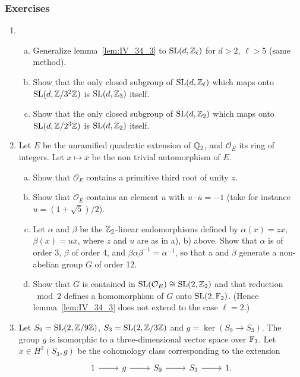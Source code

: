 \subsubsection*{Exercises}
\begin{enumerate}
\item
	\begin{enumerate}[a)]
		\item Generalize lemma~\ref{lem:IV_34_3} to $\operatorname{SL}(d, \mathbb{Z}_\ell)$
			for $d > 2$, $\ell > 5$ (same method).
		\item Show that the only closed subgroup of $\operatorname{SL}(d, \mathbb{Z}_\ell)$
			which maps onto $\operatorname{SL}(d, \mathbb{Z}/3^2\mathbb{Z})$ is $\operatorname{SL}(d, \mathbb{Z}_3)$
			itself.
		\item Show that the only closed subgroup of $\operatorname{SL}(d, \mathbb{Z}_2)$
			which maps onto $\operatorname{SL}(d, \mathbb{Z}/2^3\mathbb{Z})$ is $\operatorname{SL}(d, \mathbb{Z}_2)$
			itself.
	\end{enumerate}
\item Let $E$ be the unramified quadratic extension of $\mathbb{Q}_2$, and
	\dpage
	$\mathcal{O}_E$ its ring of integers. Let $x \mapsto \overline{x}$ be
	the non trivial automorphism of $E$.
\begin{enumerate}[a)]
	\item Show that $\mathcal{O}_E$ contains a primitive third root of
		unity $z$.
	\item Show that $\mathcal{O}_E$ contains an element $u$ with $u \cdot
		\overline{u} = -1$ (take for instance $u = (1 + \sqrt{5})/2$).
	\item Let $\alpha$ and $\beta$ be the $\mathbb{Z}_2$-linear endomorphisms
		defined by $\alpha(x) = zx$, $\beta(x) = u\overline{x}$, where
		$z$ and $u$ are as in a), b) above. Show that $\alpha$ is of
		order 3, $\beta$ of order 4, and $\beta \alpha \beta^{-1} =
		\alpha^{-1}$, so that a and $\beta$ generate a non-abelian
		group $G$ of order 12.
	\item Show that $G$ is contained in $\operatorname{SL}(\mathcal{O}_E) \cong \operatorname{SL}(2,
		\mathbb{Z}_2)$ and that reduction $\bmod 2$ defines a homomorphism of
		$G$ onto $\operatorname{SL}(2, \mathbb{F}_2)$.  (Hence lemma~\ref{lem:IV_34_3} does
		not extend to the case $\ell = 2$.)
\end{enumerate}
\item Let $S_9 = \operatorname{SL}(2, \mathbb{Z}/9\mathbb{Z})$, $S_3 = \operatorname{SL}(2, \mathbb{Z}/3\mathbb{Z})$ and $g = \ker(S_9 \to
	S_3)$. The group $g$ is isomorphic to a three-dimensional vector space
	over $\mathbb{F}_3$. Let $x \in H^2(S_3, g)$ be the cohomology class
	corresponding to the extension
	\[\begin{tikzcd}
		1 \rar & g \rar & S_9 \rar & S_3 \rar & 1.
	\end{tikzcd}\]

\end{enumerate}
